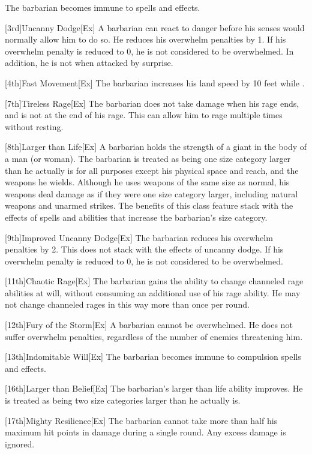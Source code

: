The barbarian becomes immune to  spells and effects.

[3rd]{Uncanny Dodge}[Ex]
A barbarian can react to danger before his senses would normally allow him to do so.
He reduces his overwhelm penalties by 1.
If his overwhelm penalty is reduced to 0, he is not considered to be overwhelmed.
In addition, he is not \unaware when attacked by surprise.

[4th]{Fast Movement}[Ex]
The barbarian increases his land speed by 10 feet while \unencumbered.

[7th]{Tireless Rage}[Ex]
The barbarian does not take damage when his rage ends, and is not \fatigued at the end of his rage.
This can allow him to rage multiple times without resting.

[8th]{Larger than Life}[Ex]
A barbarian holds the strength of a giant in the body of a man (or woman).
The barbarian is treated as being one size category larger than he actually is for all purposes except his physical space and reach, and the weapons he wields.
Although he uses weapons of the same size as normal, his weapons deal damage as if they were one size category larger, including natural weapons and unarmed strikes.
The benefits of this class feature stack with the effects of spells and abilities that increase the barbarian's size category.

[9th]{Improved Uncanny Dodge}[Ex]
The barbarian reduces his overwhelm penalties by 2.
This does not stack with the effects of uncanny dodge.
If his overwhelm penalty is reduced to 0, he is not considered to be overwhelmed.

[11th]{Chaotic Rage}[Ex]
The barbarian gains the ability to change channeled rage abilities at will, without consuming an additional use of his rage ability.
He may not change channeled rages in this way more than once per round.

[12th]{Fury of the Storm}[Ex]
A barbarian cannot be overwhelmed.
He does not suffer overwhelm penalties, regardless of the number of enemies threatening him.

[13th]{Indomitable Will}[Ex]
The barbarian becomes immune to compulsion spells and effects.

[16th]{Larger than Belief}[Ex]
The barbarian's larger than life ability improves.
He is treated as being two size categories larger than he actually is.

[17th]{Mighty Resilience}[Ex]
The barbarian cannot take more than half his maximum hit points in damage during a single round.
Any excess damage is ignored.

